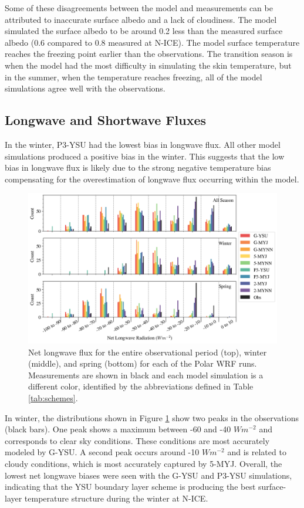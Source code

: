 Some of these disagreements between the model and measurements can be attributed to inaccurate surface albedo and a lack of cloudiness. The model simulated the surface albedo to be around 0.2 less than the measured surface albedo (0.6 compared to 0.8 measured at N-ICE). The model surface temperature reaches the freezing point earlier than the observations. The transition season is when the model had the most difficulty in simulating the skin temperature, but in the summer, when the temperature reaches freezing, all of the model simulations agree well with the observations. 

\subsection{Longwave and Shortwave Fluxes}
In the winter, P3-YSU had the lowest bias in longwave flux. All other model simulations produced a positive bias in the winter. This suggests that the low bias in longwave flux is likely due to the strong negative temperature bias compensating for the overestimation of longwave flux occurring within the model. 

  \begin{figure}[t]
    \centering
    \includegraphics[width=1\linewidth]{figures/chapter3/WRF_NetLW_Histo.png}
    \caption[Polar WRF simulated net longwave flux histograms.]{Net longwave flux for the entire observational period (top), winter (middle), and spring (bottom) for each of the Polar WRF runs. Measurements are shown in black and each model simulation is a different color, identified by the abbreviations defined in Table \ref{tab:schemes}.}
    \label{fig:wrf_netlw}
\end{figure}

 In winter, the distributions shown in Figure \ref{fig:wrf_netlw} show two peaks in the observations (black bars). One peak shows a maximum between -60 and -40 $Wm^{-2}$ and corresponds to clear sky conditions. These conditions are most accurately modeled by G-YSU. A second peak occurs around -10 $Wm^{-2}$ and is related to cloudy conditions, which is most accurately captured by 5-MYJ. Overall, the lowest net longwave biases were seen with the G-YSU and P3-YSU simulations, indicating that the YSU boundary layer scheme is producing the best surface-layer temperature structure during the winter at N-ICE. 
 
